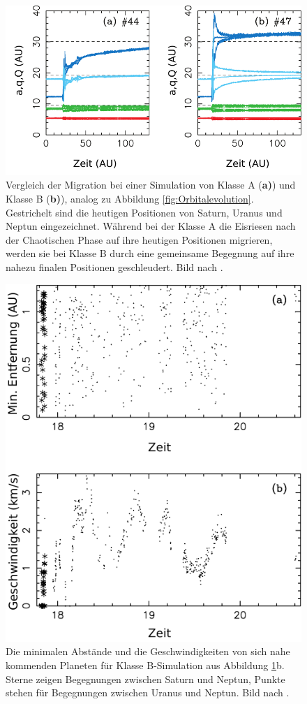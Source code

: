 \documentclass[12pt,a4paper,twoside]{article}
\renewcommand{\cite}{\citep}
\begin{document}
\begin{figure}[tbn]
\centering
\includegraphics[scale=0.9]{img/Nesvorny2007-1}
\caption{Vergleich der Migration bei einer Simulation von Klasse A (\textbf{a)}) und Klasse B (\textbf{b)}), analog zu Abbildung \ref{fig:Orbitalevolution}. Gestrichelt sind die heutigen Positionen von Saturn, Uranus und Neptun eingezeichnet. Während bei der Klasse A die Eisriesen nach der Chaotischen Phase auf ihre heutigen Positionen migrieren, werden sie bei Klasse B durch eine gemeinsame Begegnung auf ihre nahezu finalen Positionen geschleudert. Bild nach \cite{Nesvorny2007}.}
\label{fig:Orbitalevolution_vergleich}
\end{figure}
\begin{figure}[tbn] %
\centering
\includegraphics[scale=1]{img/Nesvorny2007-2}
\caption{Die minimalen Abstände und die Geschwindigkeiten von sich nahe kommenden Planeten für Klasse B-Simulation aus Abbildung \ref{fig:Orbitalevolution_vergleich}b. Sterne zeigen Begegnungen zwischen Saturn und Neptun, Punkte stehen für Begegnungen zwischen Uranus und Neptun. Bild nach \cite{Nesvorny2007}.}
\label{fig:Begegnungen}
\end{figure}
\end{document}
